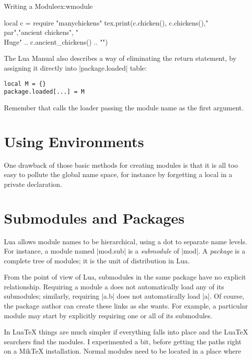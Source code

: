 \begin{texexample}{Writing a Module}{ex:wmodule}
\begin{luacode*}
   local c = require "manychickens"
   tex.print(c.chicken(), c.chickens(),"\\par","ancient chickens", "{\\Huge" .. c.ancient_chickens() .. "}")
\end{luacode*}
\end{texexample}



The Lua Manual also describes a way of eliminating the return statement, by assigning it directly into |package.loaded| table:

\begin{verbatim}
local M = {}
package.loaded[...] = M
\end{verbatim}

Remember that  calls the loader passing the module name as the first argument.

\section{Using Environments}

One drawback of those basic methods for creating modules is that it is all too easy to pollute the global name space, for instance by forgetting a local in a private declaration.

\section{Submodules and Packages}

Lua allows module names to be hierarchical, using a dot to separate name levels. For instance, a module named |mod.sub| is a \textit{submodule} of |mod|. A \textit{package} is a complete tree of modules; it is the unit of distribution in Lua. 

From the point of view of Lua, submodules in the same package have no explicit relationship. Requiring a module a does not automatically load any of its submodules; similarly, requiring |a.b| does not automatically load |a|. Of course, the package author can create these links as she wants. For example, a particular module may start by explicitly requiring one or all of its submodules.

In LuaTeX things are much simpler if everything falls into place and the LuaTeX searchers find the modules. I experimented a bit, before getting the paths right on a MikTeX installation. Normal modules need to be located in a place where 

